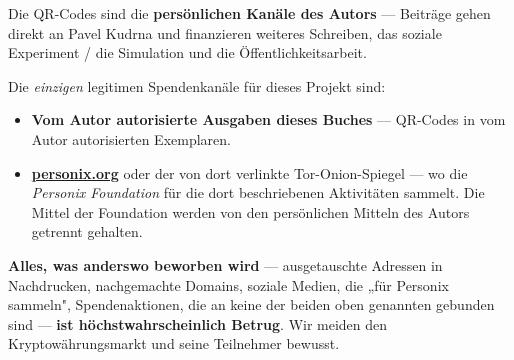 \begin{minipage}[t]{0.60\textwidth}
\vspace{0pt}
\begin{mdframed}[
  linewidth=0.7pt,roundcorner=5pt,
  innerleftmargin=10pt,innerrightmargin=10pt,
  innertopmargin=8pt,innerbottommargin=8pt,
  skipabove=0pt,skipbelow=0pt,
  linecolor=cbwarning!50,backgroundcolor=cbwarning!5,
  nobreak=true,
  needspace=4\baselineskip,
]
\footnotesize
Die QR-Codes sind die \textbf{persönlichen Kanäle des Autors} --- Beiträge gehen direkt an Pavel Kudrna und finanzieren weiteres Schreiben, das soziale Experiment / die Simulation und die Öffentlichkeitsarbeit.

\smallskip
Die \emph{einzigen} legitimen Spendenkanäle für dieses Projekt sind:

\smallskip
\begin{itemize}
\setlength{\itemsep}{0pt}
\setlength{\topsep}{0pt}
\item \textbf{Vom Autor autorisierte Ausgaben dieses Buches} --- QR-Codes in vom Autor autorisierten Exemplaren.
\item \href{https://personix.org}{\textbf{personix.org}} oder der von dort verlinkte Tor-Onion-Spiegel --- wo die \emph{Personix Foundation} für die dort beschriebenen Aktivitäten sammelt. Die Mittel der Foundation werden von den persönlichen Mitteln des Autors getrennt gehalten.
\end{itemize}

\smallskip
\textbf{Alles, was anderswo beworben wird} --- ausgetauschte Adressen in Nachdrucken, nachgemachte Domains, soziale Medien, die „für Personix sammeln", Spendenaktionen, die an keine der beiden oben genannten gebunden sind --- \textbf{ist höchstwahrscheinlich Betrug}. Wir meiden den Kryptowährungsmarkt und seine Teilnehmer bewusst.
\end{mdframed}
\end{minipage}

\clearpage
